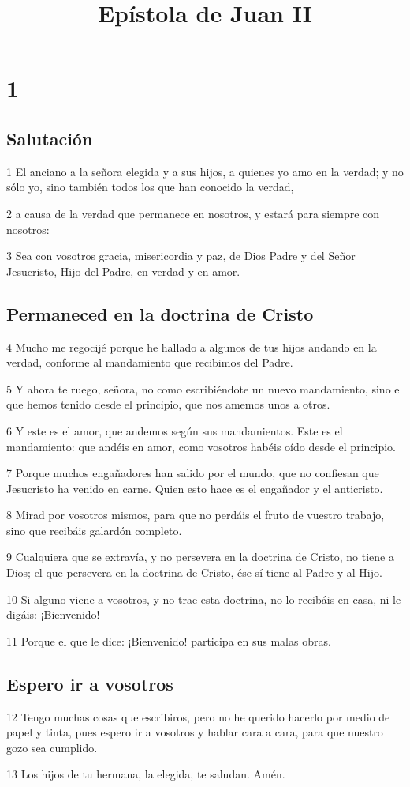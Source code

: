 
\title{Epístola de Juan II}

\chapter{1}

\section*{Salutación}

\par 1 El anciano a la señora elegida y a sus hijos, a quienes yo amo en la verdad; y no sólo yo, sino también todos los que han conocido la verdad,
\par 2 a causa de la verdad que permanece en nosotros, y estará para siempre con nosotros:
\par 3 Sea con vosotros gracia, misericordia y paz, de Dios Padre y del Señor Jesucristo, Hijo del Padre, en verdad y en amor.

\section*{Permaneced en la doctrina de Cristo}

\par 4 Mucho me regocijé porque he hallado a algunos de tus hijos andando en la verdad, conforme al mandamiento que recibimos del Padre.
\par 5 Y ahora te ruego, señora, no como escribiéndote un nuevo mandamiento, sino el que hemos tenido desde el principio, que nos amemos unos a otros.
\par 6 Y este es el amor, que andemos según sus mandamientos. Este es el mandamiento: que andéis en amor, como vosotros habéis oído desde el principio.
\par 7 Porque muchos engañadores han salido por el mundo, que no confiesan que Jesucristo ha venido en carne. Quien esto hace es el engañador y el anticristo.
\par 8 Mirad por vosotros mismos, para que no perdáis el fruto de vuestro trabajo, sino que recibáis galardón completo.
\par 9 Cualquiera que se extravía, y no persevera en la doctrina de Cristo, no tiene a Dios; el que persevera en la doctrina de Cristo, ése sí tiene al Padre y al Hijo.
\par 10 Si alguno viene a vosotros, y no trae esta doctrina, no lo recibáis en casa, ni le digáis: ¡Bienvenido!
\par 11 Porque el que le dice: ¡Bienvenido! participa en sus malas obras.

\section*{Espero ir a vosotros}

\par 12 Tengo muchas cosas que escribiros, pero no he querido hacerlo por medio de papel y tinta, pues espero ir a vosotros y hablar cara a cara, para que nuestro gozo sea cumplido.
\par 13 Los hijos de tu hermana, la elegida, te saludan. Amén.

